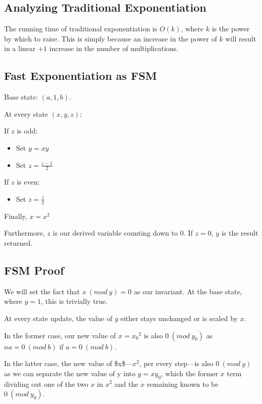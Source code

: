 \documentclass[letterpaper]{article}
\begin{document}
\subsection{Analyzing Traditional Exponentiation}
\label{sec:org7207395}
The running time of traditional exponentiation is \(O(k)\), where \(k\) is the power by which to raise. This is simply because an increase in the power of \(k\) will result in a linear \(+1\) increase in the number of multiplications.

\subsection{Fast Exponentiation as FSM}
\label{sec:org321c962}
Base state: \((a,1,b)\).

At every state \((x,y,z)\):

If \(z\) is odd:

\begin{itemize}
\item Set \(y=xy\)
\item Set \(z=\frac{z-1}{2}\)
\end{itemize}

If \(z\) is even:

\begin{itemize}
\item Set \(z= \frac{z}{2}\)
\end{itemize}

Finally, \(x = x^2\)

Furthermore, \(z\) is our derived variable counting down to \(0\). If \(z=0\), \(y\) is the result returned. 

\subsection{FSM Proof}
\label{sec:org873dfdc}
We will set the fact that \(x\ (mod\ y) = 0\) as our invariant. At the base state, where \(y=1\), this is trivially true.

At every state update, the value of \(y\) either stays unchanged or is scaled by \(x\).

In the former case, our new value of \(x={x_0}^2\) is also \(0\ (mod\ y_0)\) as \(na=0\ (mod\ b)\) if \(a=0\ (mod\ b)\).

In the latter case, the new value of \$x\$---\(x^2\), per every step---is also \(0\ (mod\ y)\) as we can separate the new value of y into \(y = xy_0\), which the former \(x\) term dividing out one of the two \(x\) in \(x^2\) and the \(x\) remaining known to be \(0\ (mod\ y_0)\). 
\end{document}
